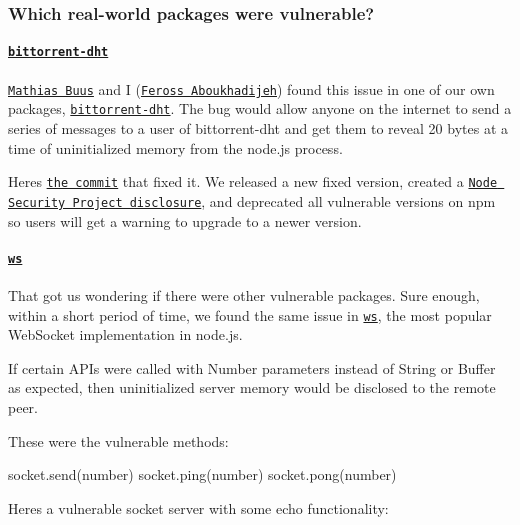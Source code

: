 \subsubsection*{Which real-\/world packages were vulnerable?}

\paragraph*{\href{https://www.npmjs.com/package/bittorrent-dht}{\tt {\ttfamily bittorrent-\/dht}}}

\href{https://github.com/mafintosh}{\tt Mathias Buus} and I (\href{http://feross.org/}{\tt Feross Aboukhadijeh}) found this issue in one of our own packages, \href{https://www.npmjs.com/package/bittorrent-dht}{\tt {\ttfamily bittorrent-\/dht}}. The bug would allow anyone on the internet to send a series of messages to a user of {\ttfamily bittorrent-\/dht} and get them to reveal 20 bytes at a time of uninitialized memory from the node.\+js process.

Here\textquotesingle{}s \href{https://github.com/feross/bittorrent-dht/commit/6c7da04025d5633699800a99ec3fbadf70ad35b8}{\tt the commit} that fixed it. We released a new fixed version, created a \href{https://nodesecurity.io/advisories/68}{\tt Node Security Project disclosure}, and deprecated all vulnerable versions on npm so users will get a warning to upgrade to a newer version.

\paragraph*{\href{https://www.npmjs.com/package/ws}{\tt {\ttfamily ws}}}

That got us wondering if there were other vulnerable packages. Sure enough, within a short period of time, we found the same issue in \href{https://www.npmjs.com/package/ws}{\tt {\ttfamily ws}}, the most popular Web\+Socket implementation in node.\+js.

If certain A\+P\+Is were called with {\ttfamily Number} parameters instead of {\ttfamily String} or {\ttfamily Buffer} as expected, then uninitialized server memory would be disclosed to the remote peer.

These were the vulnerable methods\+:


\begin{DoxyCode}
socket.send(number)
socket.ping(number)
socket.pong(number)
\end{DoxyCode}


Here\textquotesingle{}s a vulnerable socket server with some echo functionality\+:


